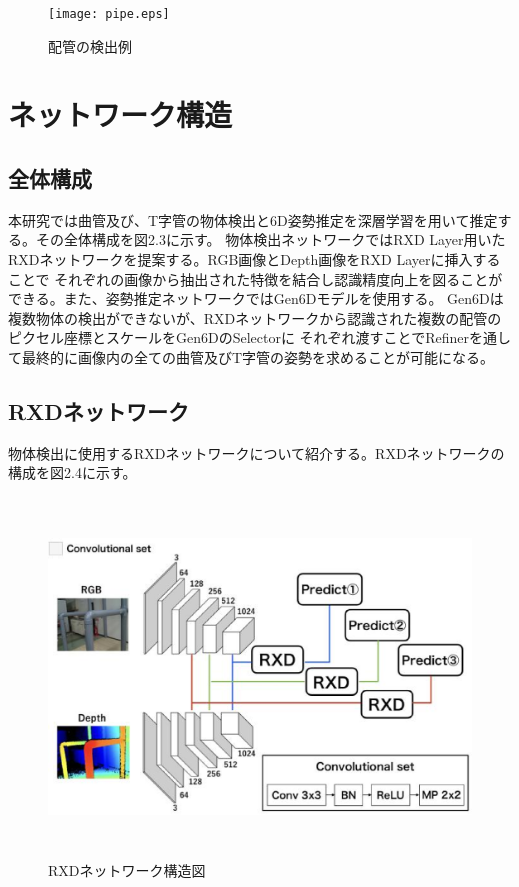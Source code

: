 \begin{figure}[htbt]
	\centering
	 \texttt{[image: pipe.eps]}
	 \caption{配管の検出例}
	 \label{fig:f2}
\end{figure}

\section{ネットワーク構造}

\subsection{全体構成}
本研究では曲管及び、T字管の物体検出と6D姿勢推定を深層学習を用いて推定する。その全体構成を図2.3に示す。
物体検出ネットワークではRXD Layer用いたRXDネットワークを提案する。RGB画像とDepth画像をRXD Layerに挿入することで
それぞれの画像から抽出された特徴を結合し認識精度向上を図ることができる。また、姿勢推定ネットワークではGen6Dモデルを使用する。
Gen6Dは複数物体の検出ができないが、RXDネットワークから認識された複数の配管のピクセル座標とスケールをGen6DのSelectorに
それぞれ渡すことでRefinerを通して最終的に画像内の全ての曲管及びT字管の姿勢を求めることが可能になる。

\subsection{RXDネットワーク}
物体検出に使用するRXDネットワークについて紹介する。RXDネットワークの構成を図2.4に示す。

\begin{figure}[htbt]
	\centering
	 \includegraphics[height=95mm]{RXDnet.eps}
	 \caption{RXDネットワーク構造図}
	 \label{fig:f2}
\end{figure}